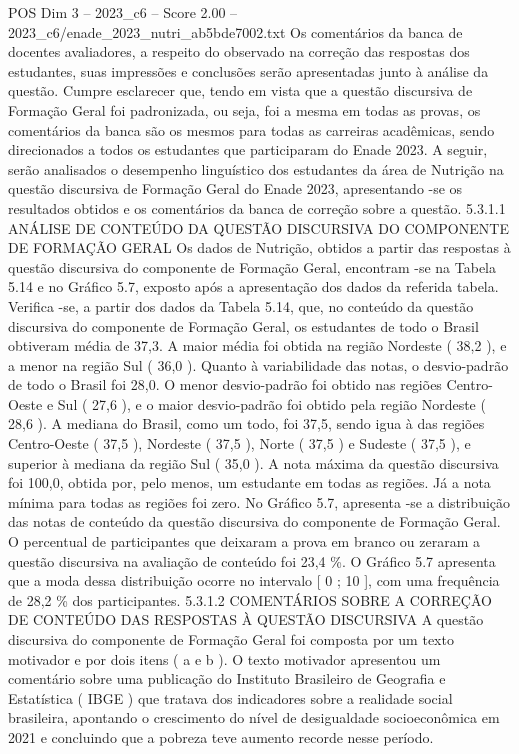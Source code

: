 \begin{textsample}{POS Dim 3 – 2023\_c6 – Score 2.00 – 2023\_c6/enade\_2023\_nutri\_ab5bde7002.txt}
Os comentários da banca de docentes avaliadores, a respeito do observado na correção das respostas dos estudantes, suas impressões e conclusões serão apresentadas junto à análise da questão.
Cumpre esclarecer que, tendo em vista que a questão discursiva de Formação Geral foi padronizada, ou seja, foi a mesma em todas as provas, os comentários da banca são os mesmos para todas as carreiras acadêmicas, sendo direcionados a todos os estudantes que participaram do Enade 2023.
A seguir, serão analisados o desempenho linguístico dos estudantes da área de Nutrição na questão discursiva de Formação Geral do Enade 2023, apresentando -se os resultados obtidos e os comentários da banca de correção sobre a questão. 5.3.1.1 ANÁLISE DE CONTEÚDO DA QUESTÃO DISCURSIVA DO COMPONENTE DE FORMAÇÃO GERAL Os dados de Nutrição, obtidos a partir das respostas à questão discursiva do componente de Formação Geral, encontram -se na Tabela 5.14 e no Gráfico 5.7, exposto após a apresentação dos dados da referida tabela.
Verifica -se, a partir dos dados da Tabela 5.14, que, no conteúdo da questão discursiva do componente de Formação Geral, os estudantes de todo o Brasil obtiveram média de 37,3.
A maior média foi obtida na região Nordeste ( 38,2 ), e a menor na região Sul ( 36,0 ).
Quanto à variabilidade das notas, o desvio-padrão de todo o Brasil foi 28,0.
O menor desvio-padrão foi obtido nas regiões Centro-Oeste e Sul ( 27,6 ), e o maior desvio-padrão foi obtido pela região Nordeste ( 28,6 ).
A mediana do Brasil, como um todo, foi 37,5, sendo igua à das regiões Centro-Oeste ( 37,5 ), Nordeste ( 37,5 ), Norte ( 37,5 ) e Sudeste ( 37,5 ), e superior à mediana da região Sul ( 35,0 ).
A nota máxima da questão discursiva foi 100,0, obtida por, pelo menos, um estudante em todas as regiões.
Já a nota mínima para todas as regiões foi zero.
No Gráfico 5.7, apresenta -se a distribuição das notas de conteúdo da questão discursiva do componente de Formação Geral.
O percentual de participantes que deixaram a prova em branco ou zeraram a questão discursiva na avaliação de conteúdo foi 23,4 \%.
O Gráfico 5.7 apresenta que a moda dessa distribuição ocorre no intervalo [ 0 ; 10 ], com uma frequência de 28,2 \% dos participantes. 5.3.1.2 COMENTÁRIOS SOBRE A CORREÇÃO DE CONTEÚDO DAS RESPOSTAS À QUESTÃO DISCURSIVA A questão discursiva do componente de Formação Geral foi composta por um texto motivador e por dois itens ( a e b ).
O texto motivador apresentou um comentário sobre uma publicação do Instituto Brasileiro de Geografia e Estatística ( IBGE ) que tratava dos indicadores sobre a realidade social brasileira, apontando o crescimento do nível de desigualdade socioeconômica em 2021 e concluindo que a pobreza teve aumento recorde nesse período.

\end{textsample}
